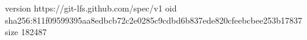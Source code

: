 version https://git-lfs.github.com/spec/v1
oid sha256:811f09599395aa8edbcb72c2e0285c9cdbd6b837ede820cfeebcbee253b17837
size 182487
